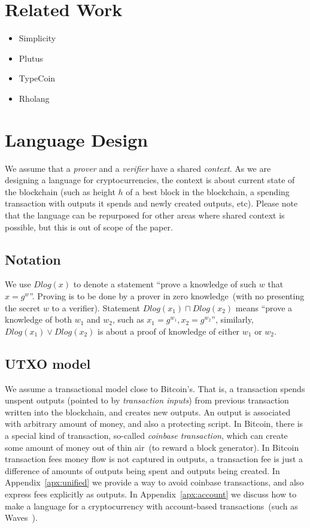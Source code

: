 \documentclass[11pt]{llncs}
\newcommand{\authnote}[2]{\marginpar{\parbox{\marginparwidth}{\tiny %
  \textsf{#1 {\textcolor{blue}{notes: #2}}}}}%
  \textcolor{blue}{\textbf{\dag}}}
\newcommand{\authnote}[2]{
  \textsf{#1 \textcolor{blue}{: #2}}}
\newcommand{\authnote}[2]{}
\newcommand{\knote}[1]{{\authnote{\textcolor{green}{kushti notes}}{#1}}}
\begin{document}
\section{Related Work}

\knote{A good survey is available at https://arxiv.org/pdf/1801.00687.pdf, pg. 11}

\begin{itemize}
    \item{Simplicity}
    \item{Plutus}
    \item{TypeCoin}
    \item{Rholang}
\end{itemize}


\section{Language Design}

We assume that a {\em prover} and a {\em verifier} have a shared {\em context}. As we are designing a language for cryptocurrencies, the context is about current state of the blockchain (such as height $h$ of a best block in the blockchain, a spending transaction with outputs it spends and newly created outputs, etc). Please note that the language can be repurposed for other areas where shared context is possible, but this is out of scope of the paper.

\subsection{Notation}

We use $Dlog(x)$ to denote a statement ``prove a knowledge of such $w$ that $x = g^w$''. Proving is to be done by a prover in zero knowledge~(with no presenting the secret $w$ to a verifier). Statement $Dlog(x_1) \sqcap Dlog(x_2)$ means ``prove a knowledge of both $w_1$ and $w_2$, such as $x_1 = g^{w_1}, x_2 = g^{w_2}$'', similarly, $Dlog(x_1) \lor Dlog(x_2)$ is about a proof of knowledge of either $w_1$ or $w_2$.

\subsection{UTXO model}

We assume a transactional model close to Bitcoin's. That is, a transaction spends unspent outputs (pointed to by \emph{transaction inputs}) from previous transaction written into the blockchain, and creates new outputs. An output is associated with arbitrary amount of money, and also a protecting script. In Bitcoin, there is a special kind of transaction, so-called {\em coinbase transaction}, which can create some amount of money out of thin air~(to reward a block generator). In Bitcoin transaction fees money flow is not captured in outputs, a transaction fee is just a difference of amounts of outputs being spent and outputs being created. In Appendix~\ref{apx:unified} we provide a way to avoid coinbase transactions, and also express fees explicitly as outputs. In Appendix~\ref{apx:account} we discuss how to make a language for a cryptocurrency with account-based transactions~(such as Waves~\cite{Waves}).
\end{document}
